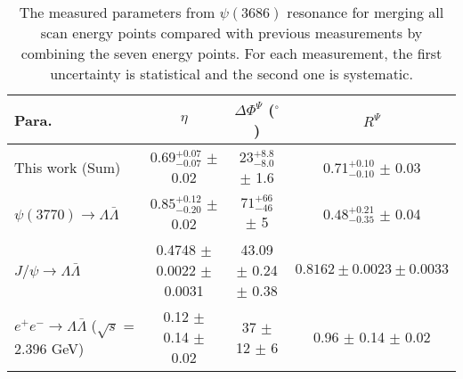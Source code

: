 \documentclass[a4paper,11pt]{article}
\begin{document}
\begin{table*}[htbp]
\scriptsize
\caption{\label{table:sum_decay} The measured parameters from $\psi(3686)$ resonance for merging all scan energy points compared with previous measurements by combining the seven energy points. For each measurement, the first uncertainty is statistical and the second one is systematic.
}
\begin{tabular}{lccc} 
\hline
\hline
Para.   &$\eta$ &$\Delta\Phi^{\Psi}$ ($^\circ$) &$R^{\Psi}$  \\ \hline

This work (Sum)   &0.69$^{+0.07}_{-0.07}$ $\pm$ 0.02 &23$^{+8.8}_{-8.0}$ $\pm$ 1.6  &0.71$^{+0.10}_{-0.10}$ $\pm$ 0.03 \\
$\psi(3770)\to\Lambda\bar\Lambda$~\cite{BESIII:2021cvv} &$0.85^{+0.12}_{-0.20}$ $\pm$ 0.02  &$71^{+66}_{-46}$  $\pm$ 5  &$0.48^{+0.21}_{-0.35}$ $\pm$ 0.04 \\
$J/\psi\to\Lambda\bar\Lambda$~\cite{BESIII:2022yprl}    &0.4748 $\pm$ 0.0022 $\pm$ 0.0031 &43.09 $\pm$ 0.24 $\pm$ 0.38  &$0.8162 \pm  0.0023 \pm 0.0033$ \\
$e^{+}e^{-}\to\Lambda\bar\Lambda$ ($\sqrt{s}$ = 2.396 GeV)~\cite{BESIII:2019nep} &0.12 $\pm$ 0.14 $\pm$ 0.02  &37 $\pm$ 12 $\pm$ 6  &0.96 $\pm$ 0.14 $\pm$ 0.02
\\ 
\hline
\hline
\end{tabular}
\end{table*}
\end{document}
